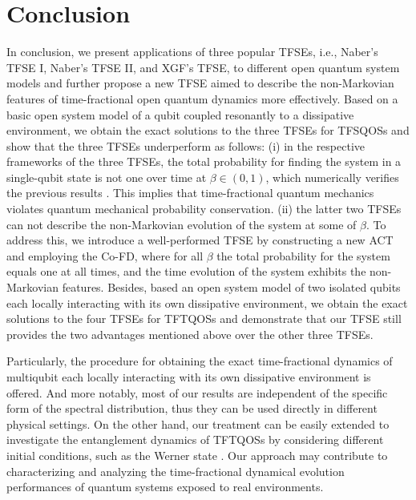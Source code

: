 \documentclass[
showpacs,  %
showkeys,  %
aps,       %
amsthm,    %
amsmath,   %
amsfonts,  %
amssymb    %
]{revtex4-1}          %
\begin{document}
\section{Conclusion}
\label{sec:5}
In conclusion, we present applications of three popular TFSEs, i.e., Naber's TFSE I, Naber's TFSE II, and XGF's TFSE, to different open quantum system models and further propose a new TFSE aimed to describe the non-Markovian features of time-fractional open quantum dynamics more effectively. Based on a basic open system model of a qubit coupled resonantly to a dissipative environment, we obtain the exact solutions to the three TFSEs for TFSQOSs and show that the three TFSEs underperform as follows: (i) in the respective frameworks of the three TFSEs, the total probability for finding the system in a single-qubit state is not one over time at $\beta\in\left({0,1}\right)$, which numerically verifies the previous results \cite{Naber2004,Achar2013,Xiang2019}. This implies that time-fractional quantum mechanics violates quantum mechanical probability conservation. (ii) the latter two TFSEs can not describe the non-Markovian evolution of the system at some of $\beta$. To address this, we introduce a well-performed TFSE by constructing a new ACT and employing the Co-FD, where for all $\beta$ the total probability for the system equals one at all times, and the time evolution of the system exhibits the non-Markovian features. Besides, based an open system model of two isolated qubits each locally interacting with its own dissipative environment, we obtain the exact solutions to the four TFSEs for TFTQOSs and demonstrate that our TFSE still provides the two advantages mentioned above over the other three TFSEs.

Particularly, the procedure for obtaining the exact time-fractional dynamics of multiqubit each locally interacting with its own dissipative environment is offered. And more notably, most of our results are independent of the specific form of the spectral distribution, thus they can be used directly in different physical settings. On the other hand, our treatment can be easily extended to investigate the entanglement dynamics of TFTQOSs by considering different initial conditions, such as the Werner state \cite{Werner1989}. Our approach may contribute to characterizing and analyzing the time-fractional dynamical evolution performances of quantum systems exposed to real environments.
\end{document}
